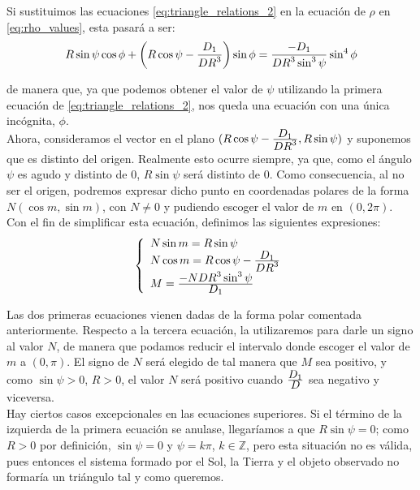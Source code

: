 Si sustituimos las ecuaciones  \eqref{eq:triangle_relations_2} en la ecuación de $\rho$ en \eqref{eq:rho_values}, esta pasará a ser:
\[
R\sin{\psi}\cos{\phi}+\left(R\cos{\psi}-\frac{\displaystyle D_1}{\displaystyle DR^3}\right)\sin{\phi}=\frac{\displaystyle -D_1}{\displaystyle DR^3\sin^3{\psi}}\sin^4{\phi}
\]

\noindent de manera que, ya que podemos obtener el valor de $\psi$ utilizando la primera ecuación de \eqref{eq:triangle_relations_2}, nos queda una ecuación con una única incógnita, $\phi$.\\

Ahora, consideramos el vector en el plano $(R\cos{\psi}-\frac{\displaystyle D_1}{\displaystyle DR^3},R\sin{\psi})$ y suponemos que es distinto del origen. Realmente esto ocurre siempre, ya que, como el ángulo $\psi$ es agudo y distinto de $0$, $R\sin{\psi}$ será distinto de $0$. Como consecuencia, al no ser el origen, podremos expresar dicho punto en coordenadas polares de la forma $N(\cos{m},\sin{m})$, con $N\neq0$ y pudiendo escoger el valor de $m$ en $(0,2\pi)$.\\

Con el fin de simplificar esta ecuación, definimos las siguientes expresiones:
\begin{align}
\left\{
\begin{array}{l}
	N\sin{m}=R\sin{\psi}\\
	N\cos{m}=R\cos{\psi}-\frac{\displaystyle D_1}{\displaystyle DR^3}\\
	M=\frac{\displaystyle -NDR^3\sin^3{\psi}}{\displaystyle D_1}
\end{array}
\right.
\label{eq:to_simplify}
\end{align}

Las dos primeras ecuaciones vienen dadas de la forma polar comentada anteriormente. Respecto a la tercera ecuación, la utilizaremos para darle un signo al valor $N$, de manera que podamos reducir el intervalo donde escoger el valor de $m$ a $(0,\pi)$. El signo de $N$ será elegido de tal manera que $M$ sea positivo, y como $\sin{\psi}>0$, $R>0$, el valor $N$ será positivo cuando $\frac{\displaystyle D_1}{\displaystyle D}$ sea negativo y viceversa.\\

Hay ciertos casos excepcionales en las ecuaciones superiores. Si el término de la izquierda de la primera ecuación se anulase, llegaríamos a que $R\sin{\psi}=0$; como $R>0$ por definición, $\sin{\psi}=0$ y $\psi=k\pi$, $k\in\mathbb{Z}$, pero esta situación no es válida, pues entonces el sistema formado por el Sol, la Tierra y el objeto observado no formaría un triángulo tal y como queremos.\\

